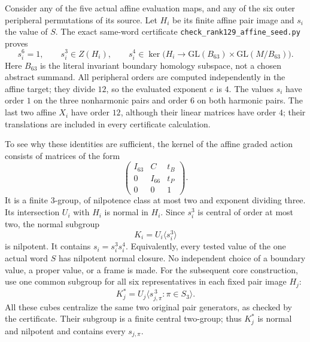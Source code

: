 Consider any of the five actual affine evaluation maps,
and any of the six outer peripheral permutations of its
source.  Let $H_i$ be its finite affine pair image and
$s_i$ the value of $S$.  The exact same-word certificate
\texttt{check\_rank129\_affine\_seed.py} proves
\[
 s_i^6=1,\qquad s_i^3\in Z(H_i),\qquad
 s_i^4\in\ker\bigl(H_i\longrightarrow
       \mathrm{GL}(B_{63})\times\mathrm{GL}(M/B_{63})\bigr).
\]
Here $B_{63}$ is the literal invariant boundary homology
subspace, not a chosen abstract summand.  All peripheral
orders are computed independently in the affine target;
they divide $12$, so the evaluated exponent $e$ is $4$.
The values $s_i$ have order $1$ on the three nonharmonic
pairs and order $6$ on both harmonic pairs.  The last two
affine $X_i$ have order $12$, although their linear
matrices have order $4$; their translations are included
in every certificate calculation.

To see why these identities are sufficient, the kernel
of the affine graded action consists of matrices of the
form
\[
 \begin{pmatrix}
  I_{63}&C&t_B\\
  0&I_{66}&t_P\\
  0&0&1
 \end{pmatrix}.
\]
It is a finite $3$-group, of nilpotence class at most two
and exponent dividing three.  Its intersection $U_i$
with $H_i$ is normal in $H_i$.  Since $s_i^3$ is central
of order at most two, the normal subgroup
\[
             K_i=U_i\langle s_i^3\rangle
\]
is nilpotent.  It contains $s_i=s_i^3s_i^4$.
Equivalently, every tested value of the one actual word
$S$ has nilpotent normal closure.  No independent choice
of a boundary value, a proper value, or a frame is made.
For the subsequent core construction, use one common subgroup
for all six representatives in each fixed pair image $H_j$:
\[
 K_j^*=U_j\bigl\langle s_{j,\pi}^{\,3}:
                       \pi\in S_3\bigr\rangle.
\]
All these cubes centralize the same two original pair
generators, as checked by the certificate.  Their subgroup
is a finite central two-group; thus $K_j^*$ is normal and
nilpotent and contains every $s_{j,\pi}$.

